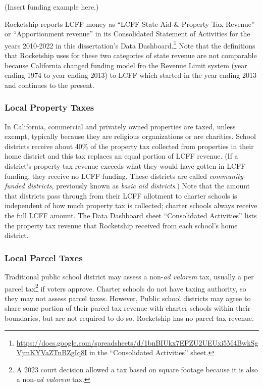 (Insert funding example here.)

Rocketship reports LCFF money as ``LCFF State Aid \& Property Tax Revenue'' or ``Apportionment revenue'' in its Consolidated Statement of Activities for the years 2010-2022 in this dissertation's Data Dashboard.\footnote{\url{https://docs.google.com/spreadsheets/d/1bnBIUkx7EPZU2UEUxi5M4BwkSgVjmKYVaZTnBZgIq8I} in the ``Consolidated Activities'' sheet.} Note that the definitions that Rocketship uses for these two categories of state revenue are not comparable because California changed funding model fro the Revenue Limit system (year ending 1974 to year ending 2013) to LCFF which started in the year ending 2013 and continues to the present.

\subsubsection{Local Property Taxes}%
\label{sec:property-taxes}\indent%

In California, commercial and privately owned properties are taxed, unless exempt, typically because they are religious organizations or are charities. School districts receive about 40\% of the property tax collected from properties in their home district and this tax replaces an equal portion of LCFF revenue. (If a district's property tax revenue exceeds what they would have gotten in LCFF funding, they receive no LCFF funding. These districts are called \textit{community-funded districts}, previously known as \textit{basic aid districts}.) Note that the amount that districts pass through from their LCFF allotment to charter schools is independent of how much property tax is collected; charter schools always receive the full LCFF amount. The Data Dashboard sheet ``Consolidated Activities'' lists the property tax revenue that Rocketship received from each school's home district.

\subsubsection{Local Parcel Taxes}%
\label{sec:parcel-taxes}\indent%

Traditional public school district may assess a non-\textit{ad valorem} tax, usually a per parcel tax\footnote{A 2023 court decision allowed a tax based on square footage because it is also a non-\textit{ad valorem} tax.} if voters approve. Charter schools do not have taxing authority, so they may not assess parcel taxes. However, Public school districts may agree to share some portion of their parcel tax revenue with charter schools within their boundaries, but are not required to do so. Rocketship has no parcel tax revenue.

